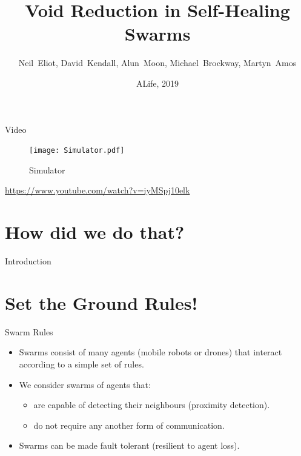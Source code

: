 \documentclass{beamer}
\title{Void Reduction in Self-Healing Swarms}
\author[N.~Eliot et al.]{Neil~Eliot\inst{1}, David~Kendall\inst{1}, Alun~Moon\inst{1}, Michael~Brockway\inst{1}, Martyn~Amos\inst{1}}
\institute[Northumbria University] %
{
  \inst{1}
  Department of Computer and Information Sciences\\
  University of Northumbria
}
\date{ALife, 2019}
\begin{document}
\begin{frame}
  \titlepage
\end{frame}

\begin{frame}{Video}
  \begin{center}
    \begin{figure}
      \begin{center}
        \texttt{[image: Simulator.pdf]}
      \end{center}
      \caption{Simulator}
    \end{figure}
    \href{https://www.youtube.com/watch?v=iyMSpj10elk}{https://www.youtube.com/watch?v=iyMSpj10elk}
  \end{center}
\end{frame}  

\section{How did we do that?}

\begin{frame}{Introduction}
  \tableofcontents
\end{frame}


\section{Set the Ground Rules!}

\begin{frame}{Swarm Rules}
  \begin{itemize}
  \item {
    Swarms consist of many agents (mobile robots or drones) that interact according to a simple set of rules.
  }
  \item {
    We consider swarms of agents that:
    \begin{itemize}
      \item are capable of detecting their neighbours (proximity detection). 
      \item do not require any another form of communication. 
    \end{itemize}
  }
  \item {
    Swarms can be made fault tolerant (resilient to agent loss).
  }
  \end{itemize}
\end{frame}
\end{document}
